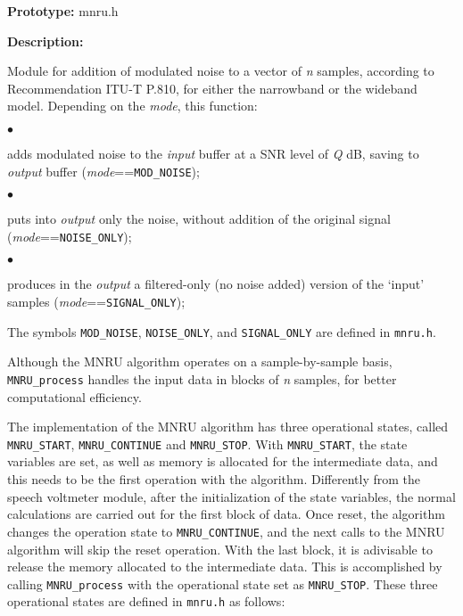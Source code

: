 {\bf Prototype: }    mnru.h

{\bf Description: }

Module for addition of modulated noise to a vector of {\it n} samples, according to Recommendation ITU-T P.810, for
either the narrowband or the wideband model. Depending on the {\it mode}, this function:

\begin{minipage}{130mm}
 $\bullet$ \parbox[t]{120mm}{
           adds modulated noise to the {\it input} buffer at a SNR level of {\it Q} dB, saving to {\it output} buffer
          ({\it mode}=={\tt MOD\_NOISE});\\}

 $\bullet$ \parbox[t]{120mm}{
          puts into {\it output} only the noise, without addition of the original signal ({\it mode}=={\tt NOISE\_ONLY});\\}

 $\bullet$ \parbox[t]{120mm}{
          produces in the {\it output} a filtered-only (no noise added) version of the `input' samples ({\it mode}=={\tt SIGNAL\_ONLY});\\}

\end{minipage}

The symbols {\tt MOD\_NOISE}, {\tt NOISE\_ONLY}, and {\tt SIGNAL\_ONLY} are defined in {\tt mnru.h}.

Although the MNRU algorithm operates on a sample-by-sample basis, {\tt MNRU\_process} handles the input data in blocks
of {\it n} samples, for better computational efficiency.

The implementation of the MNRU algorithm has three operational states, called {\tt MNRU\_START}, {\tt MNRU\_CONTINUE} and
{\tt MNRU\_STOP}.
With {\tt MNRU\_START}, the state variables are set, as well as memory is allocated for the intermediate data, and this
needs to be the first operation with the algorithm.
Differently from the speech voltmeter module, after the initialization of the state variables, the normal calculations
are carried out for the first block of data.
Once reset, the algorithm changes the operation state to {\tt MNRU\_CONTINUE}, and the next calls to the MNRU algorithm
will skip the reset operation.
With the last block, it is adivisable to release the memory allocated to the intermediate data.
This is accomplished by calling {\tt MNRU\_process} with the operational state set as {\tt MNRU\_STOP}.
These three operational states are defined in {\tt mnru.h} as follows:

